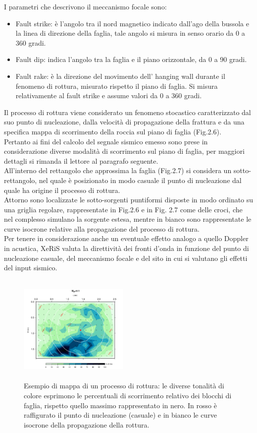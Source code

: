 \documentclass[a4paper,12pt,titlepage]{article}
\begin{document}
I parametri che descrivono il meccanismo focale sono:
\begin{itemize}
\item  Fault strike: è l'angolo tra il nord magnetico indicato dall'ago della bussola e la linea di direzione della faglia, tale angolo si misura in senso
orario da 0 a 360 gradi.
\item  Fault dip: indica l'angolo tra la faglia e il piano orizzontale, da 0 a 90 gradi.
\item Fault rake: è la direzione del movimento dell' hanging wall durante il fenomeno di rottura, misurato rispetto il piano di faglia. Si misura relativamente al fault strike e assume valori da 0 a 360 gradi.
\end{itemize}
%
Il processo di rottura viene considerato un fenomeno stocastico caratterizzato dal suo punto di nucleazione, dalla velocità di propagazione della frattura e da una specifica mappa di scorrimento della roccia sul piano di faglia (Fig.2.6).\\
Pertanto ai fini del calcolo del segnale sismico emesso sono prese in considerazione diverse modalità di scorrimento sul piano di faglia, per maggiori dettagli si rimanda il lettore al paragrafo seguente.\\
All'interno del rettangolo che approssima la faglia (Fig.2.7) si considera un sotto-rettangolo, nel quale è posizionato in modo casuale il punto di nucleazione dal quale ha origine il processo di rottura.\\
Attorno sono localizzate le sotto-sorgenti puntiformi disposte in modo ordinato su una griglia regolare, rappresentate in Fig.2.6 e in Fig. 2.7 come delle croci, che nel complesso simulano la sorgente estesa, mentre in bianco sono rappresentate le curve isocrone relative alla propagazione del processo di rottura.\\
Per tenere in considerazione anche un eventuale effetto analogo a quello Doppler in acustica, XeRiS valuta la direttività dei fronti d'onda in funzione del punto di nucleazione casuale, del meccanismo focale e del sito in cui si valutano gli effetti del input sismico.\\

\begin{figure}[htbp]
 \centering
 \includegraphics[width = 150pt, height = 150pt]{Img/SlipMap.png}
 \caption{Esempio di mappa di un processo di rottura: le diverse tonalità di colore esprimono le percentuali di scorrimento relativo dei blocchi di faglia, rispetto quello massimo rappresentato in nero. In rosso è raffigurato il punto di nucleazione (casuale) e in bianco le curve isocrone della propagazione della rottura.}
 \label{fig:SlipMap}
\end{figure}
\end{document}
